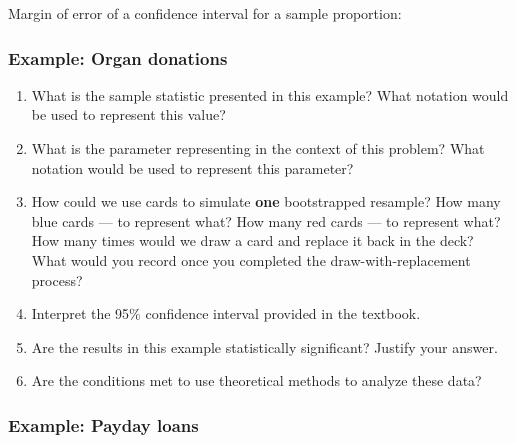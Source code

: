 \documentclass[
]{report}
\newcommand{\rgs}{\vspace{12pt}} %
\begin{document}
Margin of error of a confidence interval for a sample proportion:
\rgs

\hypertarget{example-organ-donations-1}{%
\subsubsection*{Example: Organ donations}\label{example-organ-donations-1}}

\begin{enumerate}
\def\labelenumi{\arabic{enumi}.}
\item
  What is the sample statistic presented in this example? What notation would be used to represent this value?
  \rgs
\item
  What is the parameter representing in the context of this problem? What notation would be used to represent this parameter?
  \rgs
  \rgs
\item
  How could we use cards to simulate \textbf{one} bootstrapped resample? How many blue cards --- to represent what? How many red cards --- to represent what? How many times would we draw a card and replace it back in the deck? What would you record once you completed the draw-with-replacement process?
  \rgs
  \rgs
  \rgs
\item
  Interpret the 95\% confidence interval provided in the textbook.
  \rgs
  \rgs
\item
  Are the results in this example statistically significant? Justify your answer.
  \rgs
\item
  Are the conditions met to use theoretical methods to analyze these data?
  \rgs
  \rgs
\end{enumerate}

\hypertarget{example-payday-loans-1}{%
\subsubsection*{Example: Payday loans}\label{example-payday-loans-1}}
\end{document}
